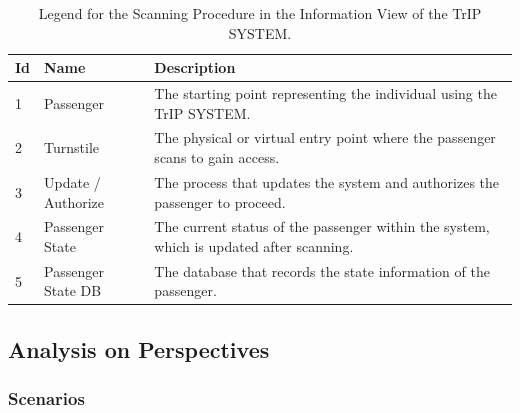 \begin{table}[H]
    \centering
    \caption{Legend for the Scanning Procedure in the Information View of the TrIP SYSTEM.}
    \label{tab:scanning_procedure_legend}
    \begin{tabular}{@{}llp{10cm}@{}}
    \toprule
    \textbf{Id} & \textbf{Name} & \textbf{Description} \\
    \midrule
    1 & Passenger & The starting point representing the individual using the TrIP SYSTEM. \\
    2 & Turnstile & The physical or virtual entry point where the passenger scans to gain access. \\
    3 & Update / Authorize & The process that updates the system and authorizes the passenger to proceed. \\
    4 & Passenger State & The current status of the passenger within the system, which is updated after scanning. \\
    5 & Passenger State DB & The database that records the state information of the passenger. \\
    \bottomrule
\end{tabular}
\end{table}

\subsection{Analysis on Perspectives}
\begin{table}[h!]
    \centering
    \caption{Information View Prioritized Quality Attributes}
    \label{tab:information_view}
\end{table}

\subsubsection{Scenarios}


